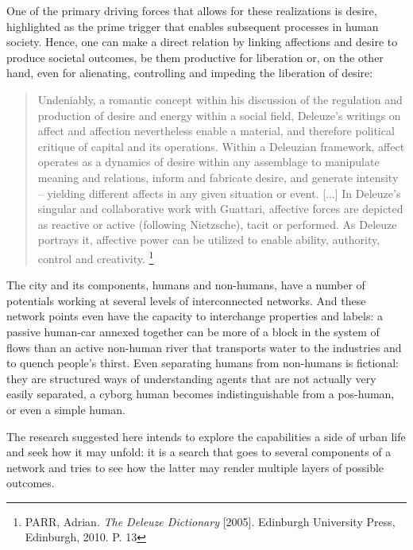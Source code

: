 One of the primary  driving forces that allows for  these realizations is desire, highlighted as the prime trigger that enables subsequent processes in human society. Hence, one can make a direct relation by linking affections and desire to produce societal outcomes, be them productive for liberation or, on the other hand, even for alienating, controlling and impeding the liberation of desire:

\begin{quote}
 Undeniably,  a romantic concept within his discussion of the regulation and production of desire and energy within a social field, Deleuze’s writings on affect and affection nevertheless enable a material, and therefore political critique of capital and its operations. Within a Deleuzian framework, affect operates as a dynamics of desire within any assemblage to manipulate meaning and relations, inform and fabricate desire, and generate intensity – yielding different affects in any given situation or event. [...] In Deleuze’s singular and collaborative work with Guattari, affective forces are depicted as reactive or active (following Nietzsche), tacit or performed. As Deleuze portrays it, affective power can be utilized to enable ability, authority, control and creativity.%
 \footnote{PARR, Adrian. \textit{The Deleuze Dictionary} [2005]. Edinburgh University Press, Edinburgh, 2010. P. 13}
 \end{quote}

The city and its components, humans and non-humans, have a number of potentials working at several levels of  interconnected networks. And these network points even have the capacity to interchange properties and labels: a passive human-car annexed together can be more of a block in the system of flows than an active non-human river that transports water to the industries and to quench people’s thirst. Even separating humans from non-humans is fictional: they are structured ways of understanding agents that are not actually very easily separated, a cyborg human becomes indistinguishable from a pos-human, or even a simple human.

The research suggested here intends to explore the capabilities a side of urban life and seek how it may unfold: it is a search that goes to several components of a network and tries to see how the latter may render multiple layers of possible outcomes.